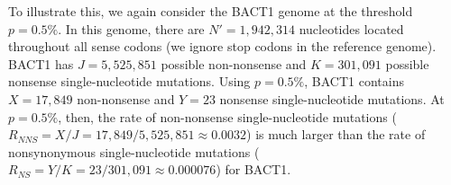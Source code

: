 To illustrate this, we again consider
the BACT1 genome at the threshold $p = 0.5\%$.
%
In this genome, there are $N' = 1,942,314$ nucleotides
located throughout all sense codons (we ignore stop codons in the reference genome).
%
BACT1 has $J = 5,525,851$ possible non-nonsense and
$K = 301,091$ possible nonsense single-nucleotide mutations.
%
Using $p = 0.5\%$, BACT1 contains
$X = 17,849$ non-nonsense and
$Y = 23$ nonsense single-nucleotide mutations.
%
At $p = 0.5\%$, then, the rate of non-nonsense single-nucleotide mutations
($R_{NNS} = X / J = 17,849 / 5,525,851
\approx 0.0032$)
is much larger than the rate of nonsynonymous single-nucleotide mutations
($R_{NS} = Y / K = 23 / 301,091
\approx 0.000076$)
for BACT1.
\endinput